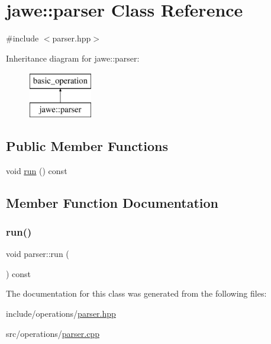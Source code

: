 \hypertarget{classjawe_1_1parser}{}\section{jawe\+:\+:parser Class Reference}
\label{classjawe_1_1parser}


{\ttfamily \#include $<$parser.\+hpp$>$}

Inheritance diagram for jawe\+:\+:parser\+:\begin{figure}[H]
\begin{center}
\leavevmode
\includegraphics[height=2.000000cm]{classjawe_1_1parser}
\end{center}
\end{figure}
\subsection*{Public Member Functions}
\begin{DoxyCompactItemize}
\item 
void \hyperlink{classjawe_1_1parser_a8e91cfed907dd4cbbd995dd03ab4d48a}{run} () const
\end{DoxyCompactItemize}


\subsection{Member Function Documentation}
\mbox{\label{classjawe_1_1parser_a8e91cfed907dd4cbbd995dd03ab4d48a}} 
\subsubsection{\texorpdfstring{run()}{run()}}
{\footnotesize\ttfamily void parser\+::run (\begin{DoxyParamCaption}{ }\end{DoxyParamCaption}) const}



The documentation for this class was generated from the following files\+:\begin{DoxyCompactItemize}
\item 
include/operations/\hyperlink{parser_8hpp}{parser.\+hpp}\item 
src/operations/\hyperlink{parser_8cpp}{parser.\+cpp}\end{DoxyCompactItemize}
